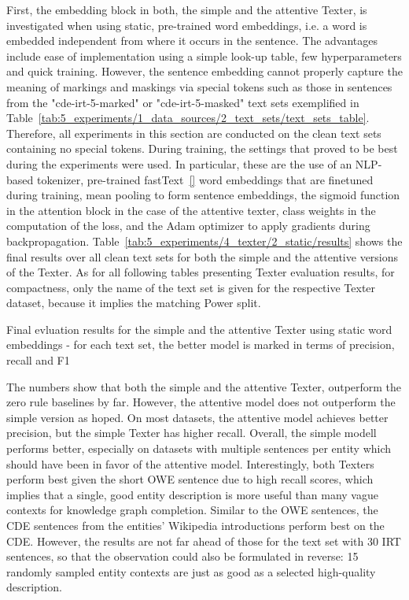 First, the embedding block in both, the simple and the attentive Texter, is investigated when using static, pre-trained word embeddings, i.e. a word is embedded independent from where it occurs in the sentence. The advantages include ease of implementation using a simple look-up table, few hyperparameters and quick training. However, the sentence embedding cannot properly capture the meaning of markings and maskings via special tokens such as those in sentences from the "cde-irt-5-marked" or "cde-irt-5-masked" text sets exemplified in Table~\ref{tab:5_experiments/1_data_sources/2_text_sets/text_sets_table}. Therefore, all experiments in this section are conducted on the clean text sets containing no special tokens. During training, the settings that proved to be best during the experiments were used. In particular, these are the use of an NLP-based tokenizer, pre-trained fastText~\ref{} word embeddings that are finetuned during training, mean pooling to form sentence embeddings, the sigmoid function in the attention block in the case of the attentive texter, class weights in the computation of the loss, and the Adam optimizer to apply gradients during backpropagation. Table~\ref{tab:5_experiments/4_texter/2_static/results} shows the final results over all clean text sets for both the simple and the attentive versions of the Texter. As for all following tables presenting Texter evaluation results, for compactness, only the name of the text set is given for the respective Texter dataset, because it implies the matching Power split.

\begin{table}[t]
    \centering
    
    \caption{Final evluation results for the simple and the attentive Texter using static word embeddings - for each text set, the better model is marked in terms of precision, recall and F1}
    \label{tab:5_experiments/4_texter/2_static/results}
\end{table}

The numbers show that both the simple and the attentive Texter, outperform the zero rule baselines by far. However, the attentive model does not outperform the simple version as hoped. On most datasets, the attentive model achieves better precision, but the simple Texter has higher recall. Overall, the simple modell performs better, especially on datasets with multiple sentences per entity which should have been in favor of the attentive model. Interestingly, both Texters perform best given the short OWE sentence due to high recall scores, which implies that a single, good entity description is more useful than many vague contexts for knowledge graph completion. Similar to the OWE sentences, the CDE sentences from the entities' Wikipedia introductions perform best on the CDE. However, the results are not far ahead of those for the text set with 30 IRT sentences, so that the observation could also be formulated in reverse: 15 randomly sampled entity contexts are just as good as a selected high-quality description.

